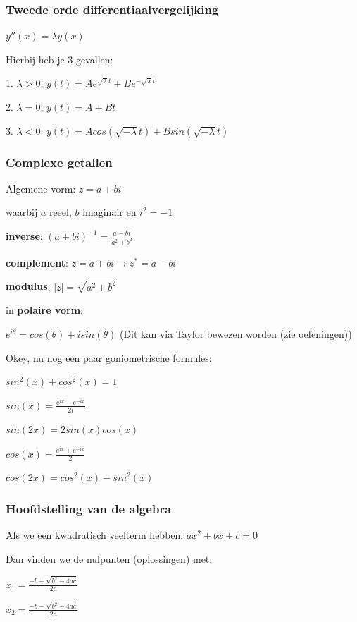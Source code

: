 \documentclass[a4paper]{article}
\begin{document}
\subsubsection{Tweede orde differentiaalvergelijking}

$y''(x) = \lambda y(x)$

Hierbij heb je 3 gevallen:

1. $\lambda > 0$: $y(t) = A e^{\sqrt{\lambda} t} + B e^{-\sqrt{\lambda} t}$

2. $\lambda = 0$: $y(t) = A + Bt$

3. $\lambda < 0$: $y(t) = A cos(\sqrt{-\lambda} t) + B sin(\sqrt{-\lambda} t)$

\subsubsection{Complexe getallen}

Algemene vorm: $z = a + bi$

waarbij $a$ reeel, $b$ imaginair en $i^2 = -1$

\textbf{inverse}: $(a + bi)^{-1} = \frac{a - bi}{a^2 + b^2}$

\textbf{complement}: $z = a + bi \rightarrow z^* = a - bi$

\textbf{modulus}: $|z| = \sqrt{a^2 + b^2}$

in \textbf{polaire vorm}:

$e^{i\theta} = cos(\theta) + i sin(\theta)$ (Dit kan via Taylor bewezen worden (zie oefeningen))

Okey, nu nog een paar goniometrische formules:

$sin^2(x) + cos^2(x) = 1$

$sin(x) = \frac{e^{ix} - e^{-ix}}{2i}$

$sin(2x) = 2sin(x)cos(x)$

$cos(x) = \frac{e^{ix} + e^{-ix}}{2}$

$cos(2x) = cos^2(x) - sin^2(x)$

\subsubsection{Hoofdstelling van de algebra}

Als we een kwadratisch veelterm hebben: $ax^2 + bx + c = 0$

Dan vinden we de nulpunten (oplossingen) met:

$x_1 = \frac{-b + \sqrt{b^2 - 4ac}}{2a}$

$x_2 = \frac{-b - \sqrt{b^2 - 4ac}}{2a}$
\end{document}
